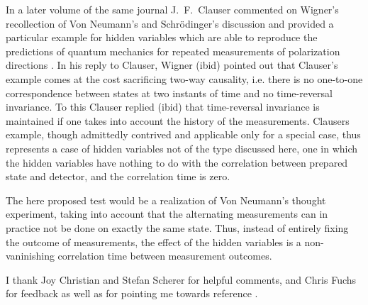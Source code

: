 \documentclass{svjour2}                    %
\begin{document}
In a later volume of the same journal J.~F.~Clauser commented on
Wigner's recollection of Von Neumann's and Schr\"odinger's discussion
and provided a particular example for hidden variables which 
are able to reproduce the predictions of
quantum mechanics for repeated measurements of polarization directions \cite{Clauser}. In
his reply to Clauser, Wigner (ibid) pointed out that Clauser's example
comes at the cost sacrificing two-way causality, i.e. there is no one-to-one
correspondence between states at two instants of time and no
time-reversal invariance. To this Clauser replied (ibid) that time-reversal
invariance is maintained if one takes into account the history of
the measurements. Clausers example, though admittedly contrived and
applicable only for a special case, thus represents
a case of hidden variables not of the type discussed here, one in which
the hidden variables have nothing to do with the correlation between
prepared state and detector, and the correlation time is zero.

The here proposed test would be a realization of Von Neumann's
thought experiment, taking into account that the alternating
measurements can in practice not be done on exactly the same
state. Thus, instead of entirely fixing the outcome of measurements,
the effect of the hidden variables is a non-vaninishing 
correlation time between measurement outcomes.


\begin{acknowledgements}

I thank Joy Christian and Stefan Scherer for helpful comments, and Chris Fuchs for feedback as well as
for pointing me towards reference \cite{Wigner:1976ga}. 
\end{acknowledgements}
\end{document}
